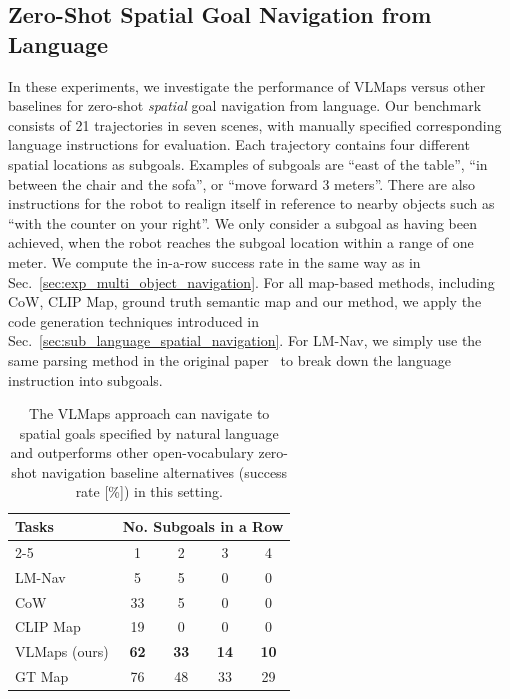 \documentclass[letterpaper, 10 pt, conference]{ieeeconf}  %
\begin{document}
\subsection{Zero-Shot Spatial Goal Navigation from Language}
\label{sec:exp_spatial_goal_navigation_language}
In these experiments, we investigate the performance of VLMaps versus other baselines for zero-shot \textit{spatial} goal navigation from language. Our benchmark consists of 21 trajectories in seven scenes, with manually specified corresponding language instructions for evaluation. Each trajectory contains four different spatial locations as subgoals. Examples of subgoals are ``east of the table'', ``in between the chair and the sofa'', or ``move forward 3 meters''. There are also instructions for the robot to realign itself in reference to nearby objects such as ``with the counter on your right''. We only consider a subgoal as having been achieved, when the robot reaches the subgoal location within a range of one meter. We compute the in-a-row success rate in the same way as in Sec.~\ref{sec:exp_multi_object_navigation}. For all map-based methods, including CoW, CLIP Map, ground truth semantic map and our method, we apply the code generation techniques introduced in Sec.~\ref{sec:sub_language_spatial_navigation}. For LM-Nav, we simply use the same parsing method in the original paper~\cite{shah2022lm} to break down the language instruction into subgoals.

\begin{table}[h]
  \setlength\tabcolsep{5.2pt}
  \centering
  \begin{tabular}{lcccc}
  \toprule
\multirow{2}[1]{*}{Tasks}  & \multicolumn{4}{l}{No. Subgoals in a Row}       \\                
                    \cmidrule(lr){2-5}
                   & 1             & 2           & 3           & 4             \\
\midrule
LM-Nav \cite{shah2022lm}& 5                  & 5               & 0               & 0                        \\
CoW \cite{gadre2022clip}& 33                  & 5               & 0               & 0                        \\
CLIP Map           & 19                  & 0                & 0               & 0                        \\
VLMaps (ours)    & \textbf{62}         & \textbf{33}      & \textbf{14}     & \textbf{10}          \\
\midrule
GT Map    & 76        & 48      & 33     & 29          \\

  \bottomrule
  \end{tabular}
  \caption{The VLMaps approach can navigate to spatial goals specified by natural language and outperforms other open-vocabulary zero-shot navigation baseline alternatives (success rate [\%]) in this setting.}
  \label{table:spatial_lang_nav}
  \vspace{-1em}
\end{table}
\end{document}

